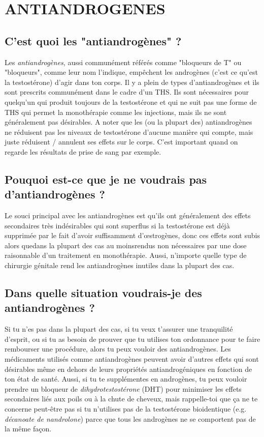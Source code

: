 \documentclass{article}
\begin{document}
\section{ANTIANDROGENES}\label{AA}

\subsection{C'est quoi les "antiandrogènes" ?}

Les \textit{antiandrogènes}, aussi communément référés comme "bloqueurs de T" ou "bloqueurs", comme leur nom l'indique, empêchent les androgènes (c'est ce qu'est la testostérone) d'agir dans ton corps. Il y a plein de types d'antiandrogènes et ils sont prescrits communément dans le cadre d'un THS. Ils sont nécessaires pour quelqu'un qui produit toujours de la testostérone et qui ne suit pas une forme de THS qui permet la monothérapie comme les injections, mais ils ne sont généralement pas désirables. A noter que les (ou la plupart des) antiandrogènes ne réduisent pas les niveaux de testostérone d'aucune manière qui compte, mais juste réduisent / annulent ses effets sur le corps. C'est important quand on regarde les résultats de prise de sang par exemple.

\subsection{Pouquoi est-ce que je ne voudrais pas d'antiandrogènes ?}

Le souci principal avec les antiandrogènes est qu'ils ont généralement des effets secondaires très indésirables qui sont superflus si la testostérone est déjà supprimée par le fait d'avoir suffisamment d'œstrogènes, donc ces effets sont subis alors que\textemdash{}dans la plupart des cas au moins\textemdash{}rendus non nécessaires par une dose raisonnable d'un traitement en monothérapie. Aussi, n'importe quelle type de chirurgie génitale rend les antiandrogènes inutiles dans la plupart des cas. 

\subsection{Dans quelle situation voudrais-je des antiandrogènes ?}

Si tu n'es pas dans la plupart des cas, si tu veux t'assurer une tranquilité d'esprit, ou si tu as besoin de prouver que tu utilises ton ordonnance pour te faire rembourser une procédure, alors tu peux vouloir des antiandrogènes. Les médicaments utilisés comme antiandrogènes peuvent avoir d'autres effets qui sont désirables même en dehors de leurs propriétés antiandrogéniques en fonction de ton état de santé. Aussi, si tu te supplémentes en androgènes, tu peux vouloir prendre un bloqueur de \textit{dihydrotestostérone} (DHT) pour minimiser les effets secondaires liés aux poils ou à la chute de cheveux, mais rappelle-toi que ça ne te concerne peut-être pas si tu n'utilises pas de la testostérone bioidentique (e.g. \textit{décanoate de nandrolone}) parce que tous les androgènes ne se comportent pas de la même façon. 
\end{document}
